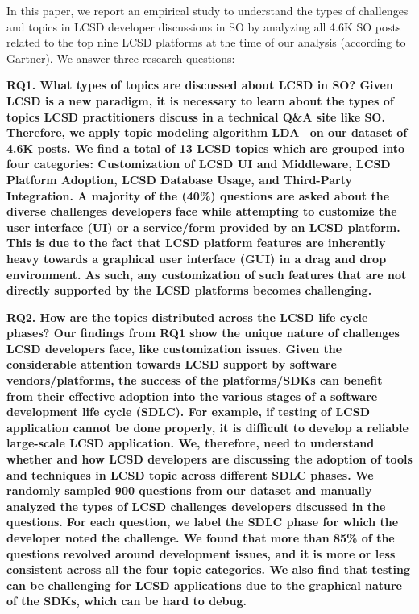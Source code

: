 In this paper, we report an empirical study to understand the types of challenges and topics in  LCSD developer discussions in SO by analyzing all 4.6K SO posts related to the top nine  LCSD platforms at the time of our analysis (according to Gartner). We answer 
three research questions:

\nd\bf{RQ1. What types of topics are discussed about  LCSD in SO?} Given  LCSD is a new paradigm, 
it is necessary to learn about the types of topics  LCSD practitioners discuss in a technical Q\&A site like SO. Therefore, we apply topic modeling algorithm LDA~\cite{blei2003latent} on our dataset of 4.6K posts. We find a total of 13  LCSD topics which are grouped into four categories: Customization of  LCSD UI and Middleware,  
 LCSD Platform Adoption,  LCSD Database Usage, and Third-Party Integration. A majority of the (40\%) questions are asked about the diverse challenges developers face while attempting to customize the user interface (UI) or a service/form provided by an  LCSD platform. This is due to the fact that 
 LCSD platform features are inherently heavy towards a graphical user interface (GUI) in a drag and drop environment. As such, any customization 
of such features that are not directly supported by the  LCSD platforms becomes challenging.     
    
\nd\bf{RQ2. How are the topics distributed across the  LCSD life cycle phases?} Our findings from RQ1 show the unique nature of challenges  LCSD developers face, like customization issues. 
Given the considerable attention towards  LCSD support by software vendors/platforms, the success of the platforms/SDKs can benefit from their effective adoption into the various stages of a software development life cycle (SDLC). For example, if testing of  LCSD 
application cannot be done properly, it is difficult to develop a reliable large-scale  LCSD application. We, therefore, 
need to understand whether and how LCSD developers are discussing the adoption of tools and techniques in  LCSD topic across different SDLC phases. We randomly sampled 900 questions from our dataset and manually analyzed the types of  LCSD challenges developers discussed in the questions. For each question, we label the SDLC phase for which the developer noted the challenge. We found that more than 85\% of the questions revolved around development issues, and it is more or less consistent across all the four topic categories. We also find that testing can be challenging for  LCSD applications due to the graphical nature of the SDKs, which can be hard to debug.   

